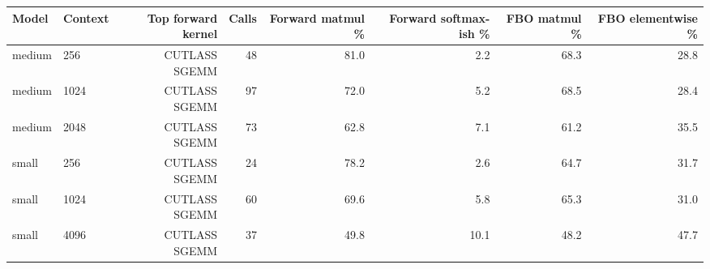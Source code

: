 \begin{tabular}{llrrrrrr}
\toprule
Model & Context & Top forward kernel & Calls & Forward matmul \% & Forward softmax-ish \% & FBO matmul \% & FBO elementwise \% \\
\midrule
medium & 256 & CUTLASS SGEMM & 48 & 81.0 & 2.2 & 68.3 & 28.8 \\
medium & 1024 & CUTLASS SGEMM & 97 & 72.0 & 5.2 & 68.5 & 28.4 \\
medium & 2048 & CUTLASS SGEMM & 73 & 62.8 & 7.1 & 61.2 & 35.5 \\
small & 256 & CUTLASS SGEMM & 24 & 78.2 & 2.6 & 64.7 & 31.7 \\
small & 1024 & CUTLASS SGEMM & 60 & 69.6 & 5.8 & 65.3 & 31.0 \\
small & 4096 & CUTLASS SGEMM & 37 & 49.8 & 10.1 & 48.2 & 47.7 \\
\bottomrule
\end{tabular}
